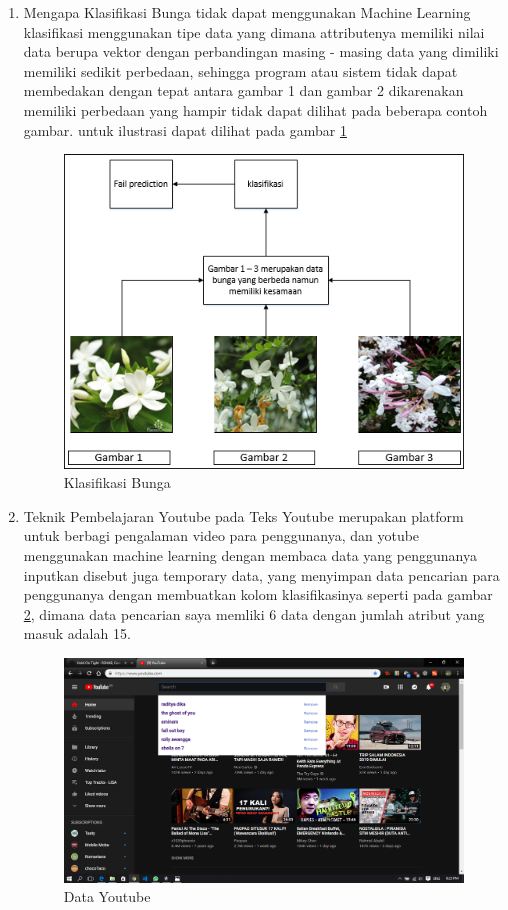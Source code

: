 \begin{enumerate}
\item Mengapa Klasifikasi Bunga tidak dapat menggunakan Machine Learning
\subitem klasifikasi menggunakan tipe data yang dimana attributenya memiliki nilai data berupa vektor dengan perbandingan masing - masing data yang dimiliki memiliki sedikit perbedaan, sehingga program atau sistem tidak dapat membedakan dengan tepat antara gambar 1 dan gambar 2 dikarenakan memiliki perbedaan yang hampir tidak dapat dilihat pada beberapa contoh gambar. untuk ilustrasi dapat dilihat pada gambar \ref{coba2}
\begin{figure}[!htbp]
	\centering
	\includegraphics[width=1\textwidth]{figures/fathi/chapter4/hari1/2}
	\caption{Klasifikasi Bunga}
	\label{coba2}
\end{figure}

\item Teknik Pembelajaran Youtube pada Teks
\subitem Youtube merupakan platform untuk berbagi pengalaman video para penggunanya, dan yotube menggunakan machine learning dengan membaca data yang penggunanya inputkan disebut juga temporary data, yang menyimpan data pencarian para penggunanya dengan membuatkan kolom klasifikasinya seperti pada gambar \ref{coba3}, dimana data pencarian saya memliki 6 data dengan jumlah atribut yang masuk adalah 15.
\begin{figure}[!htbp]
	\centering
	\includegraphics[width=1\textwidth]{figures/fathi/chapter4/hari1/3}
	\caption{Data Youtube}
	\label{coba3}
\end{figure}


\end{enumerate}
